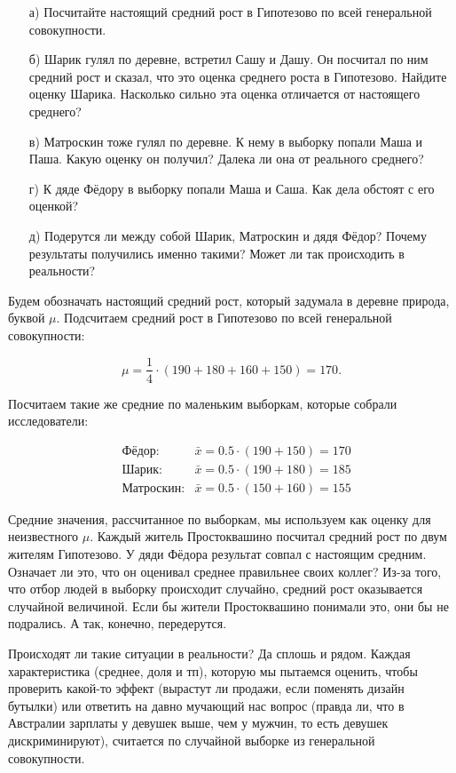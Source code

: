 \documentclass[12pt, a4paper, oneside]{article}
\begin{document}
\begin{enumerate} 
	\item[а)] Посчитайте настоящий средний рост в Гипотезово по всей генеральной совокупности.
	\item[б)] Шарик гулял по деревне, встретил Сашу и Дашу. Он посчитал по ним средний рост и сказал, что это оценка среднего роста в Гипотезово. Найдите оценку Шарика. Насколько сильно эта оценка отличается от настоящего среднего? 
	\item[в)] Матроскин тоже гулял по деревне. К нему в выборку попали Маша и Паша. Какую оценку он получил? Далека ли она от реального среднего? 
	\item[г)] К дяде Фёдору в выборку попали Маша и Саша. Как дела обстоят с его оценкой? 
	\item[д)] Подерутся ли между собой Шарик, Матроскин и дядя Фёдор? Почему результаты получились именно такими? Может ли так происходить в реальности? 
\end{enumerate} 

\begin{sol}
Будем обозначать настоящий средний рост, который задумала в деревне природа, буквой $\mu$. Подсчитаем средний рост в Гипотезово  по всей генеральной совокупности: 

\[
\mu = \frac{1}{4} \cdot (190 + 180 + 160 + 150) = 170.
\]

Посчитаем такие же средние по маленьким выборкам, которые собрали исследователи: 

\begin{equation*} 
\begin{aligned} 
& \text{Фёдор:}  & \bar{x} = 0.5 \cdot (190 + 150) = 170 \\
& \text{Шарик:}  & \bar{x} = 0.5 \cdot (190 + 180) = 185 \\
& \text{Матроскин:} & \bar{x} = 0.5 \cdot (150 + 160) = 155 
\end{aligned}
\end{equation*}

Средние значения, рассчитанное по выборкам, мы используем как оценку для неизвестного $\mu$. Каждый житель Простоквашино посчитал средний рост по двум жителям Гипотезово. У дяди Фёдора результат совпал с настоящим средним. Означает ли это, что он оценивал среднее правильнее своих коллег?    Из-за того, что отбор людей в выборку происходит случайно, средний рост оказывается случайной величиной. Если бы жители Простоквашино понимали это, они бы не подрались. А так, конечно, передерутся. 

Происходят ли такие ситуации в реальности? Да сплошь и рядом. Каждая характеристика (среднее, доля и тп), которую мы пытаемся оценить, чтобы проверить какой-то эффект (вырастут ли продажи, если поменять дизайн бутылки) или ответить на давно мучающий нас вопрос (правда ли, что в Австралии зарплаты у девушек выше, чем у мужчин, то есть девушек дискриминируют), считается по случайной выборке из генеральной совокупности.  
\end{sol}
\end{document}
